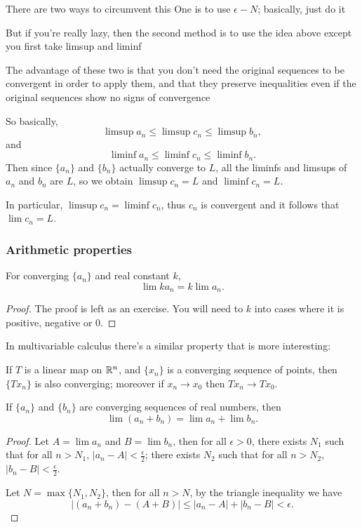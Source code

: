 There are two ways to circumvent this
One is to use $\epsilon-N$; basically, just do it

But if you're really lazy, then the second method is to use the idea above except you first take limsup and liminf

The advantage of these two is that you don't need the original sequences to be convergent in order to apply them, and that they preserve inequalities even if the original sequences show no signs of convergence

So basically,
\[ \limsup a_n\le\limsup c_n\le\limsup b_n, \]
and
\[ \liminf a_n\le\liminf c_n\le\liminf b_n. \]
Then since $\{a_n\}$ and $\{b_n\}$ actually converge to $L$, all the liminfs and limsups of $a_n$ and $b_n$ are $L$, so we obtain $\limsup c_n=L$ and $\liminf c_n=L$.

In particular, $\limsup c_n=\liminf c_n$, thus $c_n$ is convergent and it follows that $\lim c_n=L$.

\subsubsection{Arithmetic properties}
\begin{proposition}\label{prop:limit-scalarmultiplication}
For converging $\{a_n\}$ and real constant $k$,
\[ \lim ka_n=k\lim a_n. \]
\end{proposition}

\begin{proof}
The proof is left as an exercise. You will need to $k$ into cases where it is positive, negative or $0$.
\end{proof}

\begin{remark}
In multivariable calculus there's a similar property that is more interesting:

If $T$ is a linear map on $\mathbb R^n$, and $\{x_n\}$ is a converging sequence of points, then $\{Tx_n\}$ is also converging; moreover if $x_n\to x_0$ then $Tx_n\to Tx_0$.
\end{remark}

\begin{proposition}\label{prop:limit-addition}
If $\{a_n\}$ and $\{b_n\}$ are converging sequences of real numbers, then
\[ \lim(a_n+b_n)=\lim a_n+\lim b_n. \]
\end{proposition}

\begin{proof}
Let $A=\lim a_n$ and $B=\lim b_n$, then for all $\epsilon>0$, there exists $N_1$ such that for all $n>N_1$, $|a_n-A|<\frac{\epsilon}{2}$; there exists $N_2$ such that for all $n>N_2$, $|b_n-B|<\frac{\epsilon}{2}$.

Let $N=\max\{N_1,N_2\}$, then for all $n>N$, by the triangle inequality we have
\[ |(a_n+b_n)-(A+B)|\le|a_n-A|+|b_n-B|<\epsilon. \]
\end{proof}

